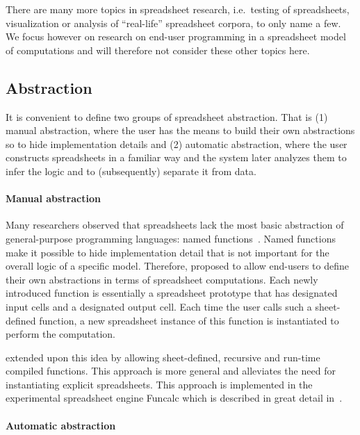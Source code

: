 \documentclass[a4paper]{article}
\begin{document}
There are many more topics in spreadsheet research, i.e.\ testing of
spreadsheets, visualization or analysis of ``real-life'' spreadsheet
corpora, to only name a few. We focus however on research on end-user
programming in a spreadsheet model of computations and will therefore
not consider these other topics here.

\subsection{Abstraction}
\label{sec:abstraction}

It is convenient to define two groups of spreadsheet abstraction. That
is (1) manual abstraction, where the user has the means to build their
own abstractions so to hide implementation details and (2) automatic
abstraction, where the user constructs spreadsheets in a familiar way
and the system later analyzes them to infer the logic and to
(subsequently) separate it from data.

\paragraph{Manual abstraction}

Many researchers observed that spreadsheets lack the most basic
abstraction of general-purpose programming languages: named
functions~\cite{Jones:2003:UAF:944705.944721}. Named functions make it
possible to hide implementation detail that is not important for the
overall logic of a specific model. Therefore,
\citet{Jones:2003:UAF:944705.944721} proposed to allow end-users to
define their own abstractions in terms of spreadsheet
computations. Each newly introduced function is essentially a
spreadsheet prototype that has designated input cells and a designated
output cell. Each time the user calls such a sheet-defined function, a
new spreadsheet instance of this function is instantiated to perform
the computation.

\citet{Sestoft:2008:IFS:1370847.1370867} extended upon this idea by
allowing sheet-defined, recursive and run-time compiled
functions. This approach is more general and alleviates the need for
instantiating explicit spreadsheets. This approach is implemented in
the experimental spreadsheet engine Funcalc which is described in
great detail in~\cite{Sestoft2014Spreadsheet}.

\paragraph{Automatic abstraction}
\end{document}
